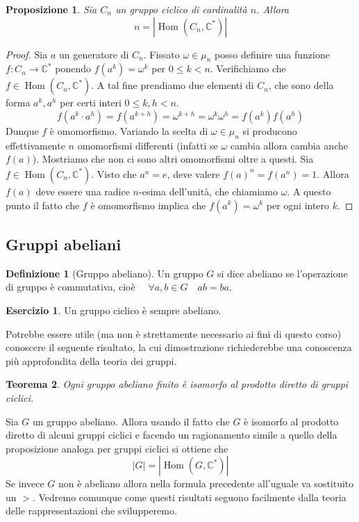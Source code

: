 \documentclass[11pt]{article}
\theoremstyle{plain}
\newtheorem{thm}{Teorema}[section]
\newtheorem{prop}[thm]{Proposizione}
\theoremstyle{definition}
\newtheorem{defn}{Definizione}[section]
\newtheorem{exercise}{Esercizio}[section]
\theoremstyle{remark}
\newcommand{\C}{\mathbb{C}}
\DeclareMathOperator{\Hom}{Hom}
\begin{document}
\begin{prop} Sia $C_n$ un gruppo ciclico di cardinalità $n$. Allora
\[ n = |\Hom(C_n,\C^*)|\]
\end{prop}
\begin{proof} Sia $a$ un generatore di $C_n$. Fissato $\omega\in\mu_n$ posso definire
una funzione $f:C_n\to\C^*$ ponendo $f(a^k) = \omega^k$ per $0\le k < n$.
Verifichiamo che $f\in \Hom(C_n, \C^*)$. A tal fine prendiamo due elementi di $C_n$, che sono della forma $a^k, a^h$ per certi interi $0\le k,h < n$.
\[f(a^k \cdot a^h) = f(a^{k+h}) = \omega^{k+h} = \omega^k \omega^h = f(a^k)f(a^h)\]
Dunque $f$ è omomorfismo. Variando la scelta di $\omega\in\mu_n$ si producono effettivamente $n$ omomorfismi differenti (infatti se $\omega$ cambia allora cambia anche $f(a)$).
Mostriamo che non ci sono altri omomorfismi oltre a questi.
Sia $f\in \Hom(C_n,\C^*)$. Visto che $a^n=e$, deve valere $f(a)^n = f(a^n) = 1$. Allora $f(a)$ deve essere una radice $n$-esima
dell'unità, che chiamiamo $\omega$. A questo punto il fatto che $f$ è omomorfismo implica che $f(a^k) = \omega^k$ per ogni intero $k$.
\end{proof}


\subsection{Gruppi abeliani}
\begin{defn}[Gruppo abeliano] Un gruppo $G$ si dice abeliano se l'operazione di gruppo è commutativa, cioè $\quad\forall a,b\in G\quad ab=ba$.
\end{defn}

\begin{exercise} Un gruppo ciclico è sempre abeliano.
\end{exercise}

Potrebbe essere utile (ma non è strettamente necessario ai fini di questo corso) conoscere il seguente risultato, la cui dimostrazione richiederebbe una conoscenza più approfondita della teoria dei gruppi.
\begin{thm}Ogni gruppo abeliano finito è isomorfo al prodotto diretto di gruppi ciclici.
\end{thm}
Sia $G$ un gruppo abeliano. Allora usando il fatto che $G$ è isomorfo al prodotto diretto di alcuni gruppi ciclici e facendo un ragionamento simile a quello
della proposizione analoga per gruppi ciclici si ottiene che
\[ |G| = |\Hom(G,\C^*)|\]
Se invece $G$ non è abeliano allora nella formula precedente all'uguale va sostituito un $>$.
Vedremo comunque come questi risultati seguono facilmente dalla teoria delle rappresentazioni che svilupperemo.
\end{document}
